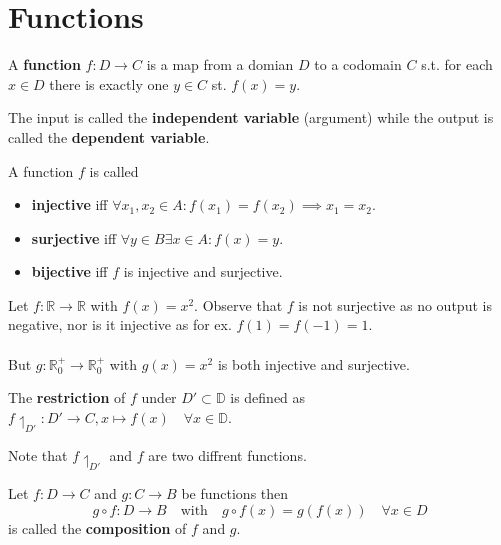 \section{Functions}

\begin{definition}
A \textbf{function} $f: D \to C$ is a map from a domian $D$ to a codomain $C$ s.t. for each $x \in D$ there is exactly one $y \in C$ st. $f(x) = y$.
\end{definition}

\begin{remark}
The input is called the \textbf{independent variable} (argument) while the output is called the \textbf{dependent variable}.
\end{remark}

\begin{definition}
A function $f$ is called
\begin{itemize}
    \item \textbf{injective} iff $\forall x_1, x_2 \in A : f(x_1) = f(x_2) \implies x_1 = x_2$.
    \item \textbf{surjective} iff $\forall y \in B \exists x \in A : f(x) = y$.
    \item \textbf{bijective} iff $f$ is injective and surjective.
\end{itemize}
\end{definition}

\begin{example}
Let $f: \mathbb{R} \to \mathbb{R}$ with $f(x) = x^2$. Observe that $f$ is not surjective as no output is negative, nor is it injective as for ex. $f(1) = f(-1) = 1$.\\\\
But $g: \mathbb{R}_{0}^+ \to \mathbb{R}_{0}^+$ with $g(x) = x^2$ is both injective and surjective.
\end{example}

\begin{definition}
The \textbf{restriction} of $f$ under $D' \subset \mathbb{D}$ is defined as $f\upharpoonleft_{D'}: D' \to C, x \mapsto f(x) \quad \forall x \in \mathbb{D}$.
\end{definition}

\begin{remark}
Note that $f\upharpoonleft_{D'}$ and $f$ are two diffrent functions.
\end{remark}

\begin{definition}
Let $f: D \to C$ and $g: C \to B$ be functions then $$ g \circ f: D \to B \quad \text{with} \quad g \circ f(x) = g(f(x)) \quad \forall x \in D $$
is called the \textbf{composition} of $f$ and $g$.
\end{definition}

